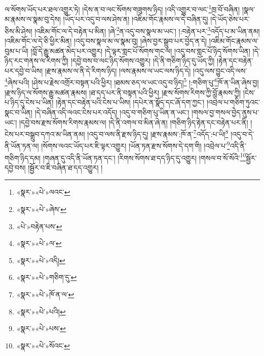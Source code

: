ལ་སོགས་ཡོད་པར་ཐལ་འགྱུར་ཏེ། །དེས་ན་བ་ལང་སོགས་གཟུགས་ཉིད། །འདི་འགྱུར་བ་ལང་\footnote{«སྣར་»«པེ་»ལའང་}ཁྲ་བོ་བཞིན། །སྣལ་མ་རྣམས་ལ་སྣམ་བུ་དེས། །ཡོད་པར་འདུ་བ་ལས་ཤེས་ན། །འཇིམ་གོང་རྣམས་ལ་དེ་བཞིན་དུ། །དེ་ཡོད་ཅེས་པར་ཅིས་མི་ཤེས། །འཇིམ་གོང་ལ་དེ་བརྟེན་པ་མིན། །ཞེ་\footnote{«སྣར་»«པེ་»ཞེས་}ན་འདུ་བས་སྣལ་མ་ཡང་། །:བརྟེན་པར་\footnote{«པེ་»བརྟེན་པས་}འདོད་པ་མ་ཡིན་ནམ། །འཇིམ་གོང་ལ་དེ་ཅི་ཕྱིར་མིན། །འདུ་བས་སྣལ་མ་ལ་སྣམ་བུ། །ཞེས་བྱར་སྒྲུབ་པར་བྱེད་ན་དེ། །འཇིམ་གོང་རྣམས་ལ་བུམ་པ་ཡི། །བློ་དེ་རྒྱུ་མཚན་མེད་པར་འགྱུར། །དེ་ལྟར་གླང་པོ་སོགས་གང་ལ། །འདུ་བས་གླང་པོ་ཉིད་སོགས་ཡིན། །དེ་ཉིད་རང་གནས་ལ་རིགས་ཀྱི། །དབྱེ་བས་བ་ལང་ཉིད་སོགས་འགྱུར། །དེ་ནི་གཅིག་ཉིད་དུ་ཡོད་ཀྱི། །རྟེན་དང་བརྟེན་པར་དབྱེ་བ་ཡིས། །རྫས་རྣམས་ལ་ནི་དེ་རིགས་ཉིད། །ལས་རྣམས་ལ་ཡང་ལས་ཉིད་དེ། །འདུ་ལས་བྱུང་འདི་ལས་\footnote{«སྣར་»«པེ་»ལ་}ཞེས་པའི། །ཤེས་པ་རྗེས་འགྲོར་བསྟན་པའི་ཕྱིར། །ཐམས་ཅད་ལ་ཡང་འདུ་བ་ཉིད།\footnote{«སྣར་»«པེ་»འདི།} །:གཅིག་པུ་\footnote{«སྣར་»«པེ་»གཅིག་དུ་}ཁོ་ན་ཡིན་ཞེས་བྱ། །རྫས་ཉིད་ལ་སོགས་རྒྱུ་མཚན་རྣམས། །ཐ་དད་པར་ནི་བསྟན་པའི་ཕྱིར། །རྫས་སོགས་རིགས་ཀྱི་བློ་རྣམས་ཀྱི། །ངེས་པ་ཉིད་དུ་ངེས་པ་ཡིན། །རྟེན་དང་བརྟེན་པའི་ངེས་པ་ཡིས། །དཔེར་ན་སྣོད་དང་ཞོ་དག་ཀྱང་། །འབྲེལ་པ་གཅིག་ཏུའང་སྣང་བ་ཡིན། །དེ་བཞིན་འདི་ལའང་ངེས་པར་འདོད། །འདུ་བ་གཅིག་པུ་ཡིན་ན་ཡང་། །གསལ་བྱ་གསལ་བྱེད་ནུས་པ་ཡང་། །དབྱེ་བས་རྫས་སོགས་རིགས་རྣམས་ལ། །དེ་ནི་འགལ་བ་མིན་ཞེ་ན། །གཅིག་ཉིད་རྟེན་དང་བརྟེན་པར་ནི། །ངེས་པར་བསྒྲུབ་དཀའ་མ་ཡིན་ནམ། །འདུ་བ་ལས་ནི་རྫས་ཉིད་དུ། །རྫས་རྣམས་:ཁོ་ན་\footnote{«སྣར་»«པེ་»ཁོ་ན་ལ་}འདོད་:པ་ཡི།\footnote{«སྣར་»«པེ་»པའི།} །འདུ་བ་དེ་ནི་ཡོན་ཏན་ལ། །སོགས་ལའང་ཡོད་པར་ཇི་ལྟར་འགྱུར། །ཡོན་ཏན་རྫས་སོགས་དེ་དག་གི། །འབྲེལ་པ་\footnote{«སྣར་»«པེ་»པས་}འདི་ནི་གཅིག་ཉིད་དམ། །གཞན་དུ་འདི་ནི་ཡོན་ཏན་དང་། །རིགས་སོགས་ཐ་དད་ཉིད་དུ་འགྱུར། །གསལ་བ་སོ་སོའི་\footnote{«སྣར་»«པེ་»སོའང་}སྦྱོར་དབྱེ་བས། །སྦྱོར་བ་ཇི་བཞིན་ཐ་དད་འགྱུར། །
